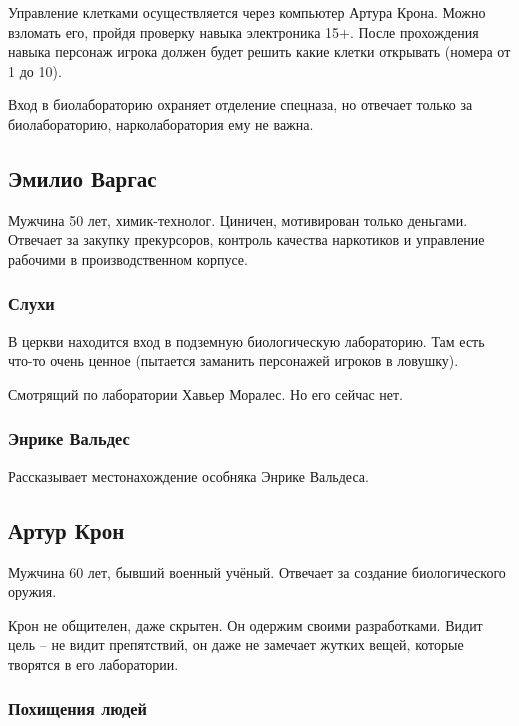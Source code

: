 \documentclass{article}
\begin{document}
Управление клетками осуществляется через компьютер Артура Крона. Можно
взломать его, пройдя проверку навыка электроника 15+. После прохождения
навыка персонаж игрока должен будет решить какие клетки открывать
(номера от 1 до 10).

Вход в биолабораторию охраняет отделение спецназа, но отвечает только за
биолабораторию, нарколаборатория ему не важна.

\subsection{Эмилио
Варгас}\label{emilio-vargas}

Мужчина 50 лет, химик-технолог. Циничен, мотивирован только деньгами.
Отвечает за закупку прекурсоров, контроль качества наркотиков и
управление рабочими в производственном корпусе.

\subsubsection{Слухи}\label{rumors-vargas}

В церкви находится вход в подземную биологическую лабораторию. Там есть
что-то очень ценное (пытается заманить персонажей игроков в ловушку).

Смотрящий по лаборатории Хавьер Моралес. Но его сейчас нет.

\subsubsection{Энрике
Вальдес}\label{enrique-valdes-vargas}

Рассказывает местонахождение особняка Энрике Вальдеса.

\subsection{Артур
Крон}\label{arthur-kron}

Мужчина 60 лет, бывший военный учёный. Отвечает за создание
биологического оружия.

Крон не общителен, даже скрытен. Он одержим своими разработками. Видит
цель -- не видит препятствий, он даже не замечает жутких вещей, которые
творятся в его лаборатории.

\subsubsection{Похищения
людей}\label{kidnapping}
\end{document}
